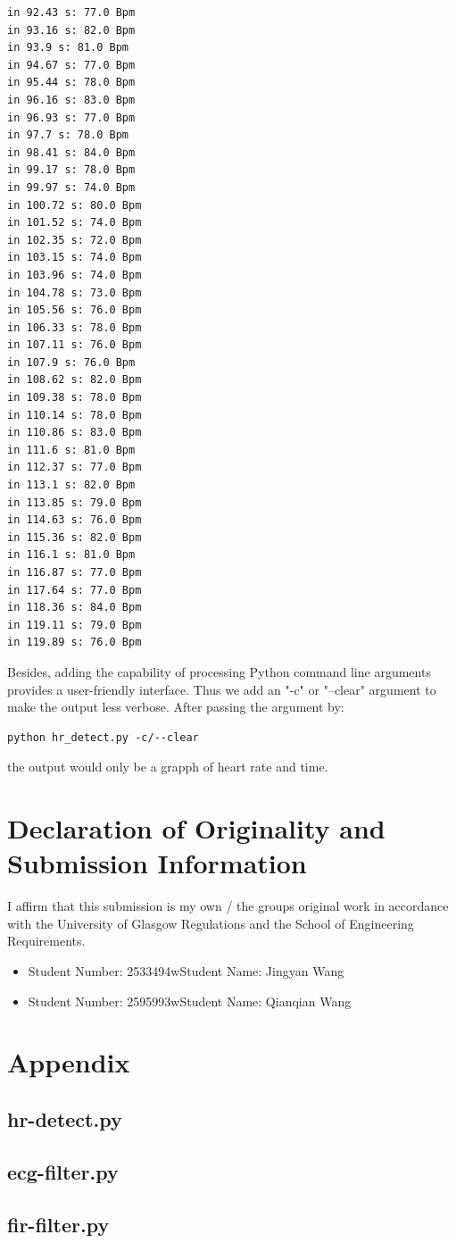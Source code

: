 \documentclass[a4paper,12pt]{article}
\begin{document}
\begin{lstlisting}
in 92.43 s: 77.0 Bpm
in 93.16 s: 82.0 Bpm
in 93.9 s: 81.0 Bpm
in 94.67 s: 77.0 Bpm
in 95.44 s: 78.0 Bpm
in 96.16 s: 83.0 Bpm
in 96.93 s: 77.0 Bpm
in 97.7 s: 78.0 Bpm
in 98.41 s: 84.0 Bpm
in 99.17 s: 78.0 Bpm
in 99.97 s: 74.0 Bpm
in 100.72 s: 80.0 Bpm
in 101.52 s: 74.0 Bpm
in 102.35 s: 72.0 Bpm
in 103.15 s: 74.0 Bpm
in 103.96 s: 74.0 Bpm
in 104.78 s: 73.0 Bpm
in 105.56 s: 76.0 Bpm
in 106.33 s: 78.0 Bpm
in 107.11 s: 76.0 Bpm
in 107.9 s: 76.0 Bpm
in 108.62 s: 82.0 Bpm
in 109.38 s: 78.0 Bpm
in 110.14 s: 78.0 Bpm
in 110.86 s: 83.0 Bpm
in 111.6 s: 81.0 Bpm
in 112.37 s: 77.0 Bpm
in 113.1 s: 82.0 Bpm
in 113.85 s: 79.0 Bpm
in 114.63 s: 76.0 Bpm
in 115.36 s: 82.0 Bpm
in 116.1 s: 81.0 Bpm
in 116.87 s: 77.0 Bpm
in 117.64 s: 77.0 Bpm
in 118.36 s: 84.0 Bpm
in 119.11 s: 79.0 Bpm
in 119.89 s: 76.0 Bpm
\end{lstlisting}
Besides, adding the capability of processing Python command line arguments provides a user-friendly interface. Thus we add an "-c" or "--clear" argument  to make the output less verbose. After passing the argument by:
\begin{lstlisting}
python hr_detect.py -c/--clear
\end{lstlisting}
the output would only be a grapph of heart rate and time.

\clearpage

\section{Declaration of Originality and Submission Information}
I affirm that this submission is my own / the groups original work in accordance with the University of Glasgow Regulations and the School of Engineering Requirements.

\begin{itemize}
	\item Student Number: 2533494w\space Student Name: Jingyan Wang
	\item Student Number: 2595993w\space Student Name: Qianqian Wang
\end{itemize}
\clearpage

\section{Appendix}
\subsection{hr-detect.py}

\subsection{ecg-filter.py}

\subsection{fir-filter.py}

\end{document}
